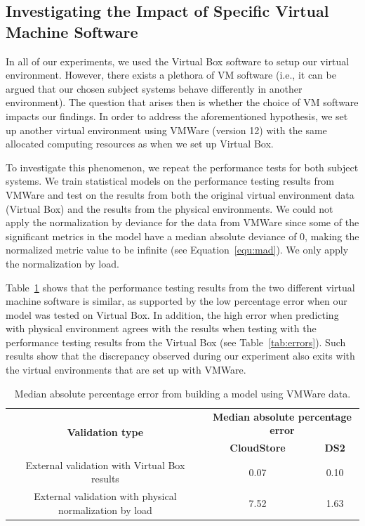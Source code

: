\documentclass[smallextended]{svjour3}       %
\begin{document}
\subsection{Investigating the Impact of Specific Virtual Machine Software}

In all of our experiments, we used the Virtual Box software to setup our virtual environment. However, there exists a plethora of VM software (i.e., it can be argued that our chosen subject systems behave differently in another environment). The question that arises then is whether the choice of VM software impacts our findings. In order to address the aforementioned hypothesis, we set up another virtual environment using VMWare (version 12) with the same allocated computing resources as when we set up Virtual Box.

To investigate this phenomenon, we repeat the performance tests for both subject systems. We train statistical models on the performance testing results from VMWare and test on the results from both the original virtual environment data (Virtual Box) and the results from the physical environments. We could not apply the normalization by deviance for the data from VMWare since some of the significant metrics in the model have a median absolute deviance of 0, making the normalized metric value to be infinite (see Equation~\ref{equ:mad}). We only apply the normalization by load. 

Table~\ref{tab:vmware} shows that the performance testing results from the two different virtual machine software is similar, as supported by the low percentage error when our model was tested on Virtual Box. In addition, the high error when predicting with physical environment agrees with the results when testing with the performance testing results from the Virtual Box (see Table~\ref{tab:errors}). Such results show that the discrepancy observed during our experiment also exits with the virtual environments that are set up with VMWare.

\begin{table}[tbh]
	\centering
	\caption{Median absolute percentage error from building a model using VMWare data.}
	\label{tab:vmware}
	\begin{tabular}{|c||c|c|}
		\hline
		\multirow{2}{*}{\textbf{Validation type}} & \multicolumn{2}{c|}{\textbf{Median absolute percentage error}} \\ \cline{2-3} 
		& \textbf{CloudStore} & \textbf{DS2} \\ %
		\midrule
		\midrule
		External validation with Virtual Box results& 0.07&0.10\\ \hline
		External validation with physical normalization by load & 7.52& 1.63 \\ \hline
	\end{tabular}
\end{table}
\end{document}
